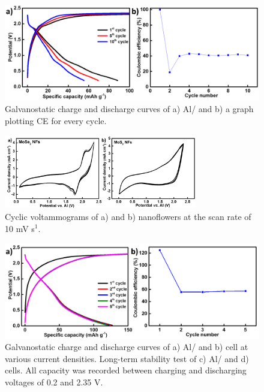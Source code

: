 \begin{figure}[h!]
  \centering
  \includegraphics[width=\textwidth]{Figures/chap6fig/mose2yncdcce}
    \caption{Galvanostatic charge and discharge curves of a) Al/ and b) a graph plotting CE for every cycle.}
  \label{Figures/chap6fig:mose2yncdcce}
\end{figure}

\begin{figure}[th!]
\centering
\includegraphics[width=0.75\textwidth]{Figures/chap6fig/mox2yncv}
\caption{Cyclic voltammograms of a) and b) nanoflowers at the scan rate of 10 mV s$^{1}$.}
\label{Figures/chap6fig:mox2yncv}
\end{figure}

\begin{figure}[h!]
  \centering
  \includegraphics[width=\textwidth]{Figures/chap6fig/mos2yncdcce}
    \caption{Galvanostatic charge and discharge curves of a) Al/ and b)  cell at various current densities. Long-term stability test of c) Al/ and d)  cells. All capacity was recorded between charging and discharging voltages of 0.2 and 2.35 V.}
  \label{Figures/chap6fig:mos2yncdcce}
\end{figure}

